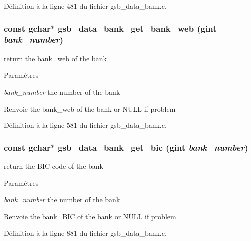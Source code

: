 Définition à la ligne 481 du fichier gsb\_\-data\_\-bank.c.

\subsubsection[{gsb\_\-data\_\-bank\_\-get\_\-bank\_\-web}]{\setlength{\rightskip}{0pt plus 5cm}const gchar$\ast$ gsb\_\-data\_\-bank\_\-get\_\-bank\_\-web (gint {\em bank\_\-number})}\label{gsb__data__bank_8h_ae13bcbbbd9aa788c437c2487caf8a339}
return the bank\_\-web of the bank


\begin{DoxyParams}{Paramètres}
\item[{\em bank\_\-number}]the number of the bank\end{DoxyParams}
\begin{DoxyReturn}{Renvoie}
the bank\_\-web of the bank or NULL if problem 
\end{DoxyReturn}


Définition à la ligne 581 du fichier gsb\_\-data\_\-bank.c.

\subsubsection[{gsb\_\-data\_\-bank\_\-get\_\-bic}]{\setlength{\rightskip}{0pt plus 5cm}const gchar$\ast$ gsb\_\-data\_\-bank\_\-get\_\-bic (gint {\em bank\_\-number})}\label{gsb__data__bank_8h_a3a7de2749f841761e47909b5c6a7bc82}
return the BIC code of the bank


\begin{DoxyParams}{Paramètres}
\item[{\em bank\_\-number}]the number of the bank\end{DoxyParams}
\begin{DoxyReturn}{Renvoie}
the bank\_\-BIC of the bank or NULL if problem 
\end{DoxyReturn}


Définition à la ligne 881 du fichier gsb\_\-data\_\-bank.c.

